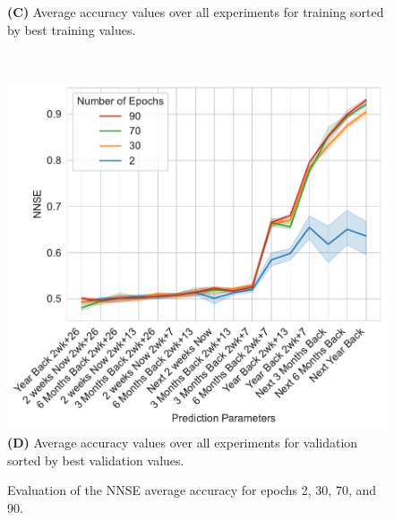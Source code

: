 \documentclass[utf8]{FrontiersinVancouver} %
\begin{document}
\begin{figure}[p]
{\begin{center}
\begin{minipage}[t]{0.49\textwidth}
        {\bf (C)} Average accuracy values over all experiments for training sorted by best training values.
     \end{minipage}
  \ \
     \begin{minipage}[t]{0.49\textwidth}
        \includegraphics[width=1.0\linewidth]{images/NNSE-all-epochs-validation}
        {\bf (D)} Average accuracy values over all experiments for validation sorted by best validation values.
     \end{minipage}

  \end{center}

  }
  
  \caption {Evaluation of the NNSE average accuracy for epochs 2, 30, 70, and 90.}
  \label{fig:NNSE-comparison-a100}

\end{figure}
\end{document}

